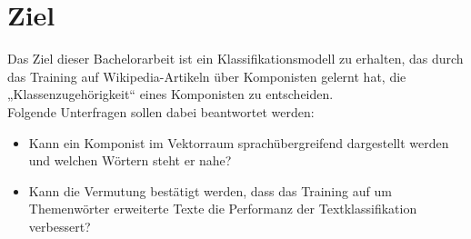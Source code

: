 \documentclass[ngerman]{ttlab-qualify}
\begin{document}
\section{Ziel}
Das Ziel dieser Bachelorarbeit ist ein Klassifikationsmodell zu erhalten, das durch das Training auf Wikipedia-Artikeln über Komponisten gelernt hat, die „Klassenzugehörigkeit“ eines Komponisten zu entscheiden.\\
Folgende Unterfragen sollen dabei beantwortet werden:
\begin{itemize}
\item Kann ein Komponist im Vektorraum sprachübergreifend dargestellt werden und welchen Wörtern steht er nahe?
\item Kann die Vermutung bestätigt werden, dass das Training auf um Themenwörter erweiterte Texte die Performanz der Textklassifikation verbessert?
\end{itemize} 
\newpage
\end{document}
